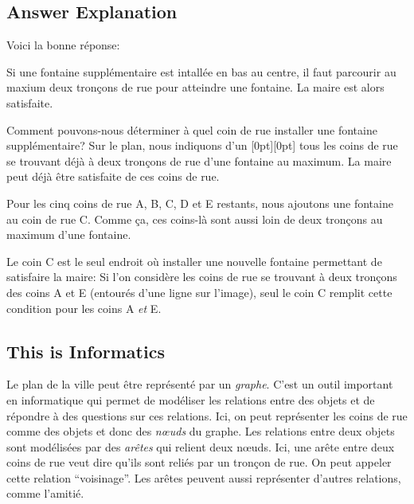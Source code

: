\documentclass[a4paper,11pt]{report}
\newcommand{\taskGraphicsFolder}{..}
\begin{document}
\endgroup

\subsection*{Answer Explanation}

Voici la bonne réponse:

{\centering%
\par}

Si une fontaine supplémentaire est intallée en bas au centre, il faut parcourir au maxium deux tronçons de rue pour atteindre une fontaine. La maire est alors satisfaite.

Comment pouvons-nous déterminer à quel coin de rue installer une fontaine supplémentaire? Sur le plan, nous indiquons d’un \raisebox{-0.5ex}[0pt][0pt]{} tous les coins de rue se trouvant déjà à deux tronçons de rue d’une fontaine au maximum. La maire peut déjà être satisfaite de ces coins de rue.

{\centering%
\par}

Pour les cinq coins de rue A, B, C, D et E restants, nous ajoutons une fontaine au coin de rue C. Comme ça, ces coins-là sont aussi loin de deux tronçons au maximum d’une fontaine.

Le coin C est le seul endroit où installer une nouvelle fontaine permettant de satisfaire la maire:
Si l’on considère les coins de rue se trouvant à deux tronçons des coins A et E (entourés d’une ligne sur l’image), seul le coin C remplit cette condition pour les coins A \emph{et} E.


\subsection*{This is Informatics}

Le plan de la ville peut être représenté par un \emph{graphe}. C’est un outil important en informatique qui permet de modéliser les relations entre des objets et de répondre à des questions sur ces relations. Ici, on peut représenter les coins de rue comme des objets et donc des \emph{nœuds} du graphe. Les relations entre deux objets sont modélisées par des \emph{arêtes} qui relient deux nœuds. Ici, une arête entre deux coins de rue veut dire qu’ils sont reliés par un tronçon de rue. On peut appeler cette relation “voisinage”. Les arêtes peuvent aussi représenter d’autres relations, comme l’amitié.
\end{document}
